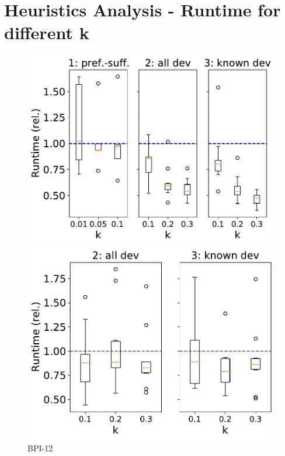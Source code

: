 \documentclass[landscape]{article}
\begin{document}
\section*{Heuristics Analysis - Runtime for different k}
\begin{figure}[!htb]
	\centering
	\begin{minipage}{0.22\textwidth}
		\includegraphics[width=1.0\textwidth]{../BPI_Challenge_2012/BPI_Challenge_2012_approximation_comparison_time.pdf}
		\caption{BPI-12}
	\end{minipage}
	\hfill
	\begin{minipage}{0.22\textwidth}
		\includegraphics[width=1.0\textwidth]{../Detail_Incident_Activity/Detail_Incident_Activity_approximation_comparison_time.pdf}

\end{minipage}
\end{figure}
\end{document}
